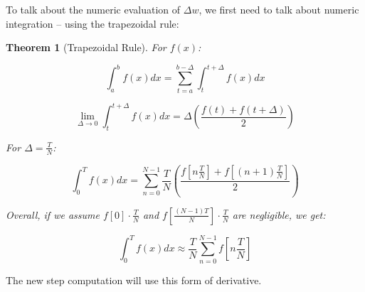 To talk about the numeric evaluation of $\Delta w$, we first need to talk about numeric integration – using the trapezoidal rule:

\newtheorem{theorem}{Theorem}

\begin{mdframed}[linewidth=2pt, frametitlerule=true, frametitlebackgroundcolor=gray!20, innertopmargin=10pt, innerbottommargin=10pt]
    \begin{theorem}[Trapezoidal Rule]
        For $f(x)$:
        
        \begin{equation*}
            \int_a^b f(x) dx = \sum_{t=a}^{b-\Delta} \int_t^{t+\Delta} f(x) dx
        \end{equation*}

        \begin{equation*}
            \lim_{{\Delta\to0}} \int_t^{t+\Delta} f(x) dx = \Delta \left(\frac{f(t)+f(t+\Delta)}{2}\right)
        \end{equation*}

        For $\Delta = \frac{T}{N}$:

        \begin{equation*}
            \int_0^T f(x) dx = \sum_{n=0}^{N-1} \frac{T}{N}\left(\frac{f[n\frac{T}{N}]+f[(n+1)\frac{T}{N}]}{2}\right)
        \end{equation*}

        Overall, if we assume $f[0] \cdot \frac{T}{N}$ and $f\left[\frac{(N-1)T}{N}\right] \cdot \frac{T}{N}$ are negligible, we get:

        \begin{equation*}
            \int_0^T f(x) dx \approx \frac{T}{N}\sum_{n=0}^{N-1} f[n\frac{T}{N}]
        \end{equation*}
    \end{theorem}
\end{mdframed}

The new step computation will use this form of derivative.
